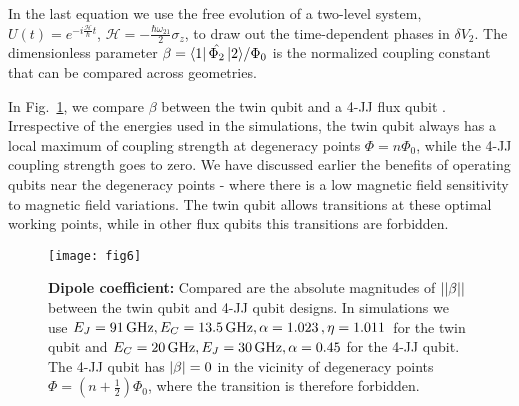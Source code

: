 \noindent  In  the  last   equation  we  use  the  free  evolution   of  a  two-level  system,
$                   U(t)=e^{-i                    \frac{\mathcal{H}}{\hbar}t}                   $,
$  \mathcal{H}  =   -\frac{\hbar\omega_{21}}{2}\sigma_z  $,  to  draw  out  the   time-dependent  phases  in
$\delta  V_2$.   The  dimensionless  parameter  $\beta =  {\Bra{1}\hat{\Phi_2}\Ket{2}}/{\Phi_0}  $  is  the
normalized coupling constant that can be compared across geometries.

In  Fig.~\ref{fig:fig5},  we  compare $\beta$  between  the  twin  qubit  and a  4-JJ  flux  qubit
\cite{honigl2018} .   Irrespective of  the energies  used in the  simulations, the  twin qubit
always has a  local maximum of coupling strength  at degeneracy points $ \Phi =  n\Phi_0$, while the
4-JJ coupling  strength goes  to zero.  We  have discussed earlier  the benefits  of operating
qubits  near the  degeneracy points  - where  there  is a  low magnetic  field sensitivity  to
magnetic field variations.  The twin qubit  allows \ilra {} transitions at these
optimal working points, while in other flux qubits this transitions are forbidden.

\begin{figure}[h]
  \centering \texttt{[image: fig6]}
  \caption{\small \textbf{Dipole  coefficient:} Compared are the absolute magnitudes of $\left|\left|\beta\right|\right|$
    between the twin qubit and 4-JJ qubit designs. In simulations we use $ E_J =  91\,\text{GHz}, E_C  = 13.5\,\text{GHz}, \alpha  = 1.023\,\text{},  \eta =1.011\,\text{} $ for the twin qubit and
    $ E_{C} = 20\,\text{GHz}, E_J=30\,\text{GHz}, \alpha=0.45 $ for the 4-JJ qubit. The 4-JJ qubit has $\left|\beta\right| = 0$ in the vicinity of degeneracy points $  \Phi =  (n+\frac{1}{2})\Phi_0$, where the transition  \ilra {} is therefore  forbidden.
    \label{fig:fig5}}
\end{figure}


 
